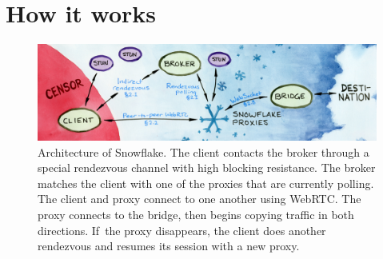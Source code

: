 \documentclass[letterpaper,twocolumn]{article}
\begin{document}

\section{How it works}
\label{sec:mechanics}

\begin{figure}[t]
\includegraphics{figures/architecture/architecture.jpg}
\caption{
Architecture of Snowflake.
The client contacts the broker through a special rendezvous channel with high blocking resistance.
The broker matches the client with one of the proxies that are currently polling.
The client and proxy connect to one another using WebRTC.
The proxy connects to the bridge,
then begins copying traffic in both directions.
If~the proxy disappears,
the client does another rendezvous
and resumes its session with a new proxy.
}
\label{fig:architecture}
\end{figure}
\end{document}
